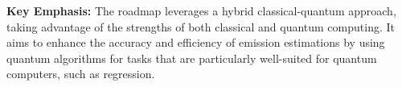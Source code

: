 \documentclass[
]{article}
\begin{document}
\begin{itemize}
  \textbf{Key Emphasis:} The roadmap leverages a hybrid
  classical-quantum approach, taking advantage of the strengths of both
  classical and quantum computing. It aims to enhance the accuracy and
  efficiency of emission estimations by using quantum algorithms for
  tasks that are particularly well-suited for quantum computers, such as
  regression.
\end{itemize}
\end{document}
